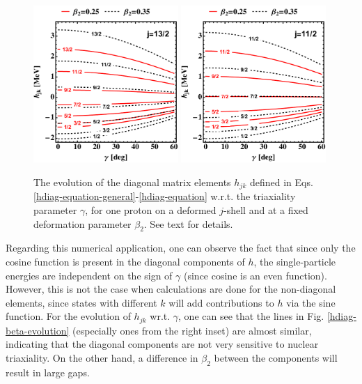 \begin{figure}
    \centering
    \includegraphics[width=0.49\textwidth]{Chapters/Figures/hdiag-gamma-1.pdf}
    \includegraphics[width=0.49\textwidth]{Chapters/Figures/hdiag-gamma-2.pdf}
    \caption{The evolution of the diagonal matrix elements $h_{jk}$ defined in Eqs. \ref{hdiag-equation-general}-\ref{hdiag-equation} w.r.t. the triaxiality parameter $\gamma$, for one proton on a deformed $j$-shell and at a fixed deformation parameter $\beta_2$. See text for details.}
    \label{hdiag-gamma-evolution}
\end{figure}

Regarding this numerical application, one can observe the fact that since only the cosine function is present in the diagonal components of $h$, the single-particle energies are independent on the sign of $\gamma$ (since cosine is an even function). However, this is not the case when calculations are done for the non-diagonal elements, since states with different $k$ will add contributions to $h$ via the sine function. For the evolution of $h_{jk}$ wr.t. $\gamma$, one can see that the lines in Fig. \ref{hdiag-beta-evolution} (especially ones from the right inset) are almost similar, indicating that the diagonal components are not very sensitive to nuclear triaxiality. On the other hand, a difference in $\beta_2$ between the components will result in large gaps.

